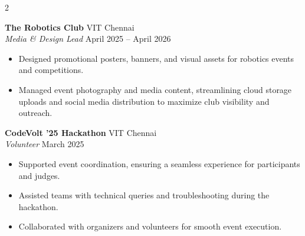\documentclass[10pt, a4paper]{article}
\newcommand{\entry}[4]{%
  \vspace{2pt}
  {\bfseries\color{bodytext} #1}\hfill{\small\color{lightgray} #3}\\
  {\small\itshape\color{accent} #2}\hfill{\small\color{lightgray} #4}
  \vspace{2pt}
}
\newenvironment{bullets}{%
  \begin{itemize}[leftmargin=1.1em, itemsep=1pt, topsep=2pt, parsep=0pt]
  \small\color{bodytext}
}{\end{itemize}}
\begin{document}
\begin{paracol}{2}
\begin{rightcolumn}
\begin{minipage}[t]{\dimexpr\linewidth-20pt}
\vspace{4pt}

\entry{The Robotics Club}{Media \& Design Lead}{VIT Chennai}{April 2025 -- April 2026}
\begin{bullets}
  \item Designed promotional posters, banners, and visual assets for robotics events and competitions.
  \item Managed event photography and media content, streamlining cloud storage uploads and social media distribution to maximize club visibility and outreach.
\end{bullets}

\vspace{4pt}

\entry{CodeVolt '25 Hackathon}{Volunteer}{VIT Chennai}{March 2025}
\begin{bullets}
  \item Supported event coordination, ensuring a seamless experience for participants and judges.
  \item Assisted teams with technical queries and troubleshooting during the hackathon.
  \item Collaborated with organizers and volunteers for smooth event execution.
\end{bullets}

\end{minipage}
\end{rightcolumn}

\end{paracol}
\end{document}
